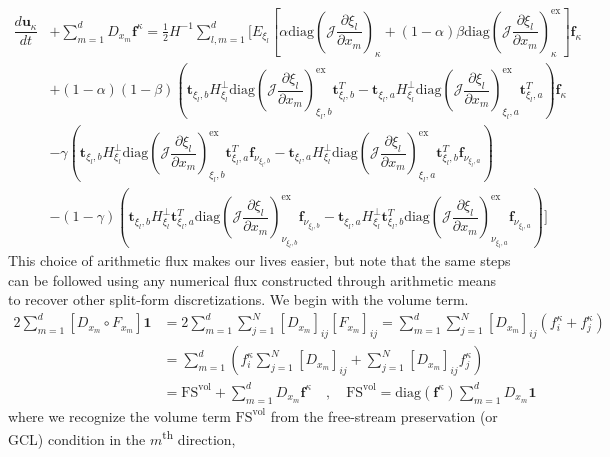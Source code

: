 \documentclass[12pt,a4paper]{article}
\newcommand{\pder}[2][]{\dfrac{\partial #1}{\partial #2}} %
\newcommand{\der}[2][]{\dfrac{d #1}{d #2}} %
\newcommand{\up}{\textsuperscript} %
\newcommand{\fn}[1]{\mathcal{#1}} %
\begin{document}
\begin{align*}
\der[\bm{u}_\kappa]{t} &+ \sum_{m=1}^d D_{x_m} \bm{f}^\kappa  =  \frac{1}{2} H^{-1} \sum_{l,m=1}^d \Bigg[ E_{\xi_l} \left[ \alpha \text{diag}  \left( \fn{J} \pder[\xi_l]{x_m} \right)_{\kappa} + (1-\alpha) \beta \text{diag}  \left( \fn{J} \pder[\xi_l]{x_m} \right)_{\kappa}^\text{ex} \right] \bm{f}_{\kappa} \\
& + (1-\alpha) (1- \beta) \left(  \bm{t}_{\xi_l, b} H^{\bot}_{\xi_l}  \text{diag} \left( \fn{J} \pder[\xi_l]{x_m} \right)_{\xi_l, b}^\text{ex} \bm{t}_{\xi_l, b}^T -  \bm{t}_{\xi_l, a} H^{\bot}_{\xi_l}  \text{diag} \left( \fn{J} \pder[\xi_l]{x_m} \right)_{\xi_l , a}^\text{ex} \bm{t}_{\xi_l, a}^T \right) \bm{f}_{\kappa} \\ 
& - \gamma \left( \bm{t}_{\xi_l, b} H^{\bot}_{\xi_l}  \text{diag} \left( \fn{J} \pder[\xi_l]{x_m} \right)_{\xi_l,b}^\text{ex} \bm{t}_{\xi_l, a}^T \bm{f}_{\nu_{\xi_l,b}} - \bm{t}_{\xi_l, a} H^{\bot}_{\xi_l} \text{diag} \left( \fn{J} \pder[\xi_l]{x_m} \right)_{\xi_l,a}^\text{ex} \bm{t}_{\xi_l, b}^T \bm{f}_{\nu_{\xi_l,a}} \right) \\
& - (1-\gamma) \left(  \bm{t}_{\xi_l, b} H^{\bot}_{\xi_l} \bm{t}_{\xi_l, a}^T \text{diag} \left( \fn{J} \pder[\xi_l]{x_m} \right)_{\nu_{\xi_l,b}}^\text{ex} \bm{f}_{\nu_{\xi_l,b}} -  \bm{t}_{\xi_l, a} H^{\bot}_{\xi_l} \bm{t}_{\xi_l, b}^T \text{diag} \left( \fn{J} \pder[\xi_l]{x_m} \right)_{\nu_{\xi_l,a}}^\text{ex} \bm{f}_{\nu_{\xi_l,a}} \right)  \Bigg]
\end{align*}
This choice of arithmetic flux makes our lives easier, but note that the same steps can be followed using any numerical flux constructed through arithmetic means to recover other split-form discretizations. We begin with the volume term.
\begin{align*}
2 \sum_{m=1}^d \left[ D_{x_m} \circ F_{x_m} \right] \bm{1} &= 2 \sum_{m=1}^d \sum_{j=1}^N [D_{x_m}]_{ij} [ F_{x_m} ]_{ij} = \sum_{m=1}^d \sum_{j=1}^N [D_{x_m}]_{ij} (f_i^\kappa + f_j^\kappa) \\
& =  \sum_{m=1}^d \left( f_i^\kappa \sum_{j=1}^N [D_{x_m}]_{ij} + \sum_{j=1}^N [D_{x_m}]_{ij} f_j^\kappa \right)  \\
& = \text{FS}^{\text{vol}} + \sum_{m=1}^d D_{x_m} \bm{f}^\kappa \quad , \quad \text{FS}^{\text{vol}} =  \text{diag}(\bm{f}^\kappa) \sum_{m=1}^d D_{x_m} \bm{1}
\end{align*}
where we recognize the volume term $\text{FS}^{\text{vol}}$ from the free-stream preservation (or GCL) condition in the $m$\up{th} direction,
\end{document}
